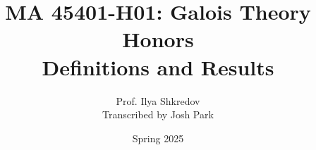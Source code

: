 \documentclass{article}
\title{MA 45401-H01: Galois Theory Honors\\Definitions and Results}
\author{Prof. Ilya Shkredov\\Transcribed by Josh Park}
\date{Spring 2025}
\begin{document}
\maketitle
\tableofcontents
\pagebreak






















\end{document}
